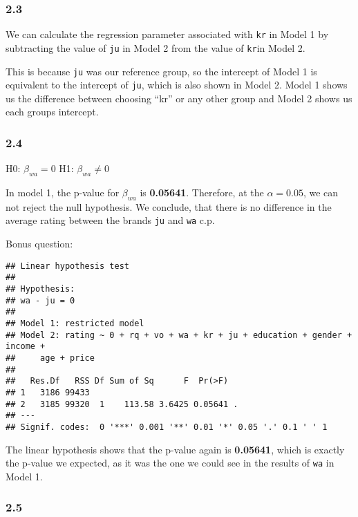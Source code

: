 \documentclass[
]{article}
\begin{document}
\hypertarget{section-1}{%
\subsubsection{2.3}\label{section-1}}

We can calculate the regression parameter associated with \texttt{kr} in
Model 1 by subtracting the value of \texttt{ju} in Model 2 from the
value of \texttt{kr}in Model 2.

This is because \texttt{ju} was our reference group, so the intercept of
Model 1 is equivalent to the intercept of \texttt{ju}, which is also
shown in Model 2. Model 1 shows us the difference between choosing
``kr'' or any other group and Model 2 shows us each groups intercept.

\newpage

\hypertarget{section-2}{%
\subsubsection{2.4}\label{section-2}}

H0: \(\beta_{wa} = 0\) H1: \(\beta_{wa} \neq 0\)

In model 1, the p-value for \(\beta_{wa}\) is \textbf{0.05641}.
Therefore, at the \(\alpha=0.05\), we can not reject the null
hypothesis. We conclude, that there is no difference in the average
rating between the brands \texttt{ju} and \texttt{wa} c.p.

Bonus question:

\begin{verbatim}
## Linear hypothesis test
## 
## Hypothesis:
## wa - ju = 0
## 
## Model 1: restricted model
## Model 2: rating ~ 0 + rq + vo + wa + kr + ju + education + gender + income + 
##     age + price
## 
##   Res.Df   RSS Df Sum of Sq      F  Pr(>F)  
## 1   3186 99433                              
## 2   3185 99320  1    113.58 3.6425 0.05641 .
## ---
## Signif. codes:  0 '***' 0.001 '**' 0.01 '*' 0.05 '.' 0.1 ' ' 1
\end{verbatim}

The linear hypothesis shows that the p-value again is \textbf{0.05641},
which is exactly the p-value we expected, as it was the one we could see
in the results of \texttt{wa} in Model 1.

\hypertarget{section-3}{%
\subsubsection{2.5}\label{section-3}}
\end{document}
